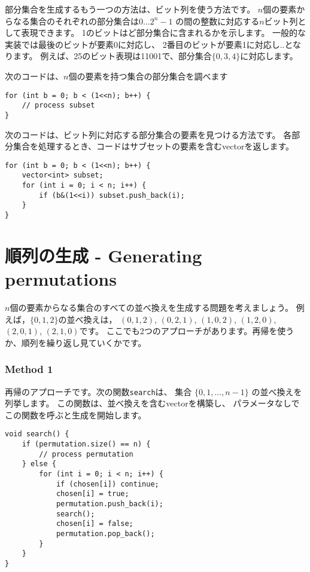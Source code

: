 部分集合を生成するもう一つの方法は、ビット列を使う方法です。
$n$個の要素からなる集合のそれぞれの部分集合は$0 \ldots 2^n-1$
の間の整数に対応する$n$ビット列として表現できます。
1のビットはど部分集合に含まれるかを示します。
一般的な実装では最後のビットが要素0に対応し、
2番目のビットが要素1に対応し..となります。
例えば、25のビット表現は11001で、部分集合$\{0,3,4\}$に対応します。

次のコードは、$n$個の要素を持つ集合の部分集合を調べます
\begin{lstlisting}
for (int b = 0; b < (1<<n); b++) {
    // process subset
}
\end{lstlisting}

次のコードは、ビット列に対応する部分集合の要素を見つける方法です。
各部分集合を処理するとき、コードはサブセットの要素を含むvectorを返します。
\begin{lstlisting}
for (int b = 0; b < (1<<n); b++) {
    vector<int> subset;
    for (int i = 0; i < n; i++) {
        if (b&(1<<i)) subset.push_back(i);
    }
}
\end{lstlisting}

\section{順列の生成 - Generating permutations}


$n$個の要素からなる集合のすべての並べ換えを生成する問題を考えましょう。
例えば，$\{0,1,2\}$の並べ換えは，
$(0,1,2)$, $(0,2,1)$, $(1,0,2)$, $(1,2,0)$,
$(2,0,1)$, $(2,1,0)$です。
ここでも2つのアプローチがあります。再帰を使うか、順列を繰り返し見ていくかです。

\subsubsection{Method 1}

再帰のアプローチです。次の関数\texttt{search}は、
集合  $\{0,1,\ldots,n-1\}$ の並べ換えを列挙します。
この関数は、並べ換えを含むvectorを構築し、
パラメータなしでこの関数を呼ぶと生成を開始します。
\begin{lstlisting}
void search() {
    if (permutation.size() == n) {
        // process permutation
    } else {
        for (int i = 0; i < n; i++) {
            if (chosen[i]) continue;
            chosen[i] = true;
            permutation.push_back(i);
            search();
            chosen[i] = false;
            permutation.pop_back();
        }
    }
}
\end{lstlisting}

